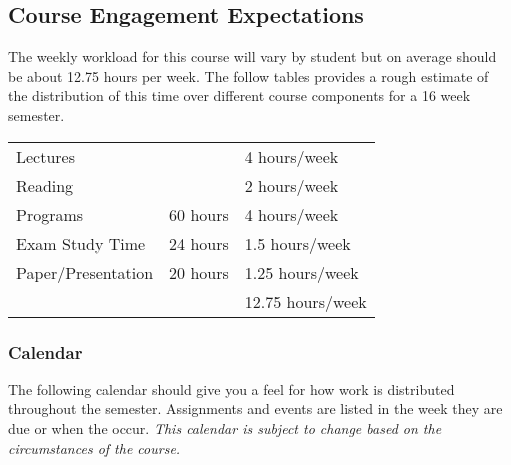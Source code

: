 \documentclass[10pt]{article}
\begin{document}
\subsection{Course Engagement Expectations}

The weekly workload for this course will vary by student but on average should be about 12.75 hours per week.  The follow tables provides a rough estimate of the distribution of this time over different course components for a 16 week semester.
\begin{center}
\begin{tabular}{lll}
\toprule
Lectures&           & 4 hours/week \\
Reading &           & 2 hours/week \\
Programs & 60 hours  & 4 hours/week \\
Exam Study Time & 24 hours  & 1.5 hours/week \\
Paper/Presentation & 20 hours & 1.25 hours/week \\
\midrule
& & 12.75 hours/week \\
\bottomrule
\end{tabular}
\end{center}


\subsubsection{Calendar}

The following calendar should give you a feel for how work is distributed throughout the semester.  Assignments and events are listed in the week they are due or when the occur. \textit{This calendar is subject to change based on the circumstances of the course.}
\end{document}

